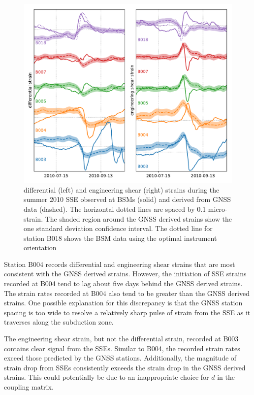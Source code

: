 \documentclass[10pt,a4paper]{article}
\begin{document}
\begin{figure}
\includegraphics{figures/SSE1.pdf}
\caption{differential (left) and engineering shear (right) strains during the summer 2010 SSE observed at BSMs (solid) and derived from GNSS data (dashed). The horizontal dotted lines are spaced by 0.1 micro-strain. The shaded region around the GNSS derived strains show the one standard deviation confidence interval. The dotted line for station B018 shows the BSM data using the optimal instrument orientation}   
\label{fig:SSE1}
\end{figure}

Station B004 records differential and engineering shear strains that are most consistent with the GNSS derived strains. However, the initiation of SSE strains recorded at B004 tend to lag about five days behind the GNSS derived strains. The strain rates recorded at B004 also tend to be greater than the GNSS derived strains. One possible explanation for this discrepancy is that the GNSS station spacing is too wide to resolve a relatively sharp pulse of strain from the SSE as it traverses along the subduction zone. 

The engineering shear strain, but not the differential strain, recorded at B003 contains clear signal from the SSEs. Similar to B004, the recorded strain rates exceed those predicted by the GNSS stations. Additionally, the magnitude of strain drop from SSEs consistently exceeds the strain drop in the GNSS derived strains. This could potentially be due to an inappropriate choice for $d$ in the coupling matrix.
\end{document}
